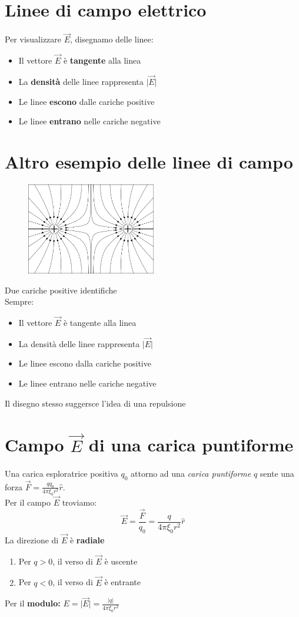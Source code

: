 \documentclass{book}
\newcommand{\abs}[1]{\lvert#1\rvert}
\begin{document}
\section{Linee di campo elettrico}
Per visualizzare $\vec{E}$, disegnamo delle linee:
\begin{itemize}
	\item Il vettore $\vec{E}$ è \textbf{tangente} alla linea 
	\item La \textbf{densità} delle linee rappresenta $\abs{\vec{E}}$
        \item Le linee \textbf{escono} dalle cariche positive
        \item Le linee \textbf{entrano} nelle cariche negative
\end {itemize}
\section {Altro esempio delle linee di campo}
\begin{figure}[!h]
 	\centering
	\includegraphics[height=4cm]{img/linee elettriche repulsione.png}
\end{figure}
Due cariche positive identifiche\\
Sempre:
\begin{itemize}
\item Il vettore $\vec{E}$ è tangente alla linea
\item La densità delle linee rappresenta $\abs {\vec{E}}$
\item Le linee escono dalla cariche positive
\item Le linee entrano nelle cariche negative
\end{itemize}
Il disegno stesso suggersce l'idea di una repulsione
\section{Campo $\vec{E}$ di una carica puntiforme}
Una carica esploratrice positiva $q_0$ attorno ad una \textit{carica puntiforme} $q$ sente una forza $\vec{F}=\frac{qq_0}{4\pi \xi_0r^2}\hat{r}$. \\
Per il campo $\vec{E}$ troviamo:
\begin{equation}
	\vec{E}=\frac{\vec{F}}{q_0}=\frac{q}{4\pi \xi_0r^2}\hat{r}
\end{equation}
La direzione di $\vec{E}$ è \textbf{radiale}
\begin{enumerate}
\item Per $q>0$, il verso di $\vec{E}$ è uscente
\item Per $q<0$, il verso di $\vec{E}$ è entrante
\end{enumerate}
Per il \textbf{modulo:} $E=\abs{\vec{E}}=\frac{\abs q}{4\pi \xi_0r^2}$  
\end{document}
